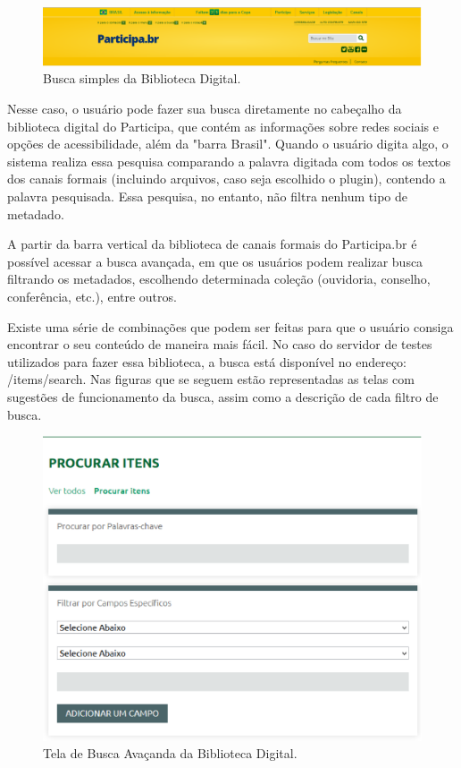 \graphicspath{{figuras/prototipo/}}
\begin{figure}[H]
\centering
\includegraphics[width=1.0\textwidth]{cabecalho}
\caption{Busca simples da Biblioteca Digital.}
\label{fig:buscasimples_prototipo}
\end{figure}

Nesse caso, o usuário pode fazer sua busca diretamente no cabeçalho da biblioteca digital do Participa, que contém as informações sobre redes sociais e opções de acessibilidade, além da "barra Brasil". Quando o usuário digita algo, o sistema realiza essa pesquisa comparando a palavra digitada com todos os textos dos canais formais (incluindo arquivos, caso seja escolhido o plugin), contendo a palavra pesquisada. Essa pesquisa, no entanto, não filtra nenhum tipo de metadado. 

A partir da barra vertical da biblioteca de canais formais do Participa.br é possível acessar a busca avançada, em que os usuários podem realizar busca filtrando os metadados, escolhendo determinada coleção (ouvidoria, conselho, conferência, etc.), entre outros.

Existe uma série de combinações que podem ser feitas para que o usuário consiga encontrar o seu conteúdo de maneira mais fácil. No caso do servidor de testes utilizados para fazer essa biblioteca, a busca está disponível no endereço: /items/search. Nas figuras que se seguem estão representadas as telas com sugestões de funcionamento da busca, assim como a descrição de cada filtro de busca.

\graphicspath{{figuras/prototipo/}}
\begin{figure}[H]
\centering
\includegraphics[width=1.0\textwidth]{tela-busca}
\caption{Tela de Busca Avaçanda da Biblioteca Digital.}
\label{fig:buscaavancada_prototipo}
\end{figure}

